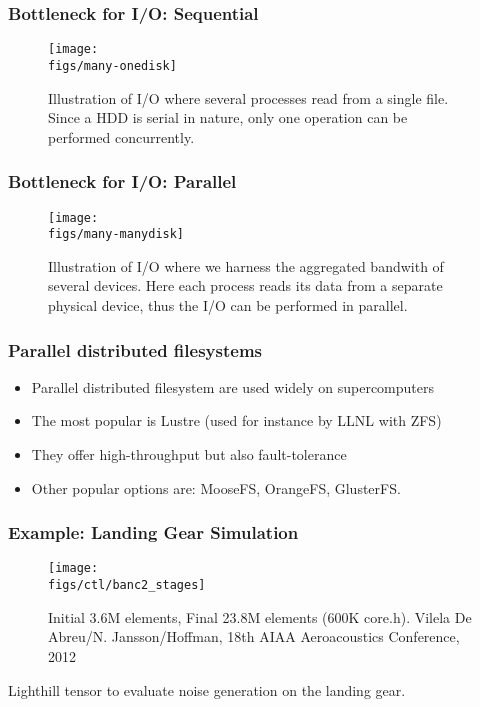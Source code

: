 \begin{frame}
  \frametitle{Bottleneck for I/O: Sequential}

\begin{figure}
  \begin{center}
    \texttt{[image: \\figs/many-onedisk]}
  \end{center}
  \caption{
    Illustration of I/O where several processes read from a single file. Since a
    HDD is serial in nature, only one operation can be performed concurrently.
  }
\label{fig:manyone}
\end{figure}
\end{frame}

\begin{frame}
  \frametitle{Bottleneck for I/O: Parallel}
\begin{figure}
  \begin{center}
    \texttt{[image: \\figs/many-manydisk]}
  \end{center}
  \caption{
    Illustration of I/O where we harness the aggregated bandwith of several
    devices. Here each process reads its data from a separate physical device,
    thus the I/O can be performed in parallel.
  }
  \label{fig:manymany}
\end{figure}

\end{frame}

\begin{frame}
  \frametitle{Parallel distributed filesystems}

\begin{itemize}
\item Parallel distributed filesystem are used widely on supercomputers
\item The most popular is Lustre (used for instance by LLNL with ZFS)
\item They offer high-throughput but also fault-tolerance
\item Other popular options are: MooseFS, OrangeFS, GlusterFS.
\end{itemize}

\end{frame}

\begin{frame}
  \frametitle{Example: Landing Gear Simulation}

\begin{figure}
  \begin{center}
    \texttt{[image: \\figs/ctl/banc2\_stages]}
  \end{center}
  \caption{Initial 3.6M elements, Final 23.8M elements (600K core.h).
Vilela De Abreu/N. Jansson/Hoffman, 18th AIAA Aeroacoustics Conference, 2012}
\end{figure}

Lighthill tensor to evaluate noise generation on the landing gear.
\end{frame}

